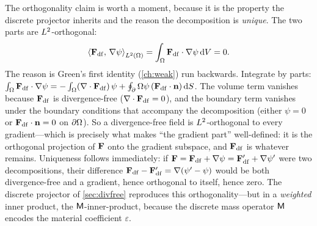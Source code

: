 The orthogonality claim is worth a moment, because it is the property the discrete
projector inherits and the reason the decomposition is \emph{unique}. The two
parts are $L^2$-orthogonal:
\begin{equation}
  \left\langle \mathbf{F}_{\mathrm{df}},\, \nabla\psi\right\rangle_{L^2(\Omega)}
  = \int_\Omega \mathbf{F}_{\mathrm{df}}\cdot\nabla\psi \,\mathrm{d}V = 0.
  \label{eq:helmorth}
\end{equation}
The reason is Green's first identity (\cref{ch:weak}) run backwards. Integrate by
parts: $\int_\Omega \mathbf{F}_{\mathrm{df}}\cdot\nabla\psi
= -\int_\Omega (\nabla\cdot\mathbf{F}_{\mathrm{df}})\,\psi
+ \oint_\partial\Omega \psi\,(\mathbf{F}_{\mathrm{df}}\cdot\mathbf{n})\,\mathrm{d}S$. The volume term
vanishes because $\mathbf{F}_{\mathrm{df}}$ is divergence-free ($\nabla\cdot\mathbf{F}_{\mathrm{df}}=0$),
and the boundary term vanishes under the boundary conditions that accompany the
decomposition (either $\psi=0$ or $\mathbf{F}_{\mathrm{df}}\cdot\mathbf{n}=0$ on $\partial\Omega$). So a
divergence-free field is $L^2$-orthogonal to every gradient---which is precisely
what makes ``the gradient part'' well-defined: it is the orthogonal projection of
$\mathbf{F}$ onto the gradient subspace, and $\mathbf{F}_{\mathrm{df}}$ is whatever remains.
Uniqueness follows immediately: if $\mathbf{F}=\mathbf{F}_{\mathrm{df}}+\nabla\psi
=\mathbf{F}'_{\mathrm{df}}+\nabla\psi'$ were two decompositions, their difference
$\mathbf{F}_{\mathrm{df}}-\mathbf{F}'_{\mathrm{df}}=\nabla(\psi'-\psi)$ would be both
divergence-free and a gradient, hence orthogonal to itself, hence zero. The
discrete projector of \cref{sec:divfree} reproduces this orthogonality---but in a
\emph{weighted} inner product, the $\mathsf{M}$-inner-product, because the discrete
mass operator $\mathsf{M}$ encodes the material coefficient $\varepsilon$.

